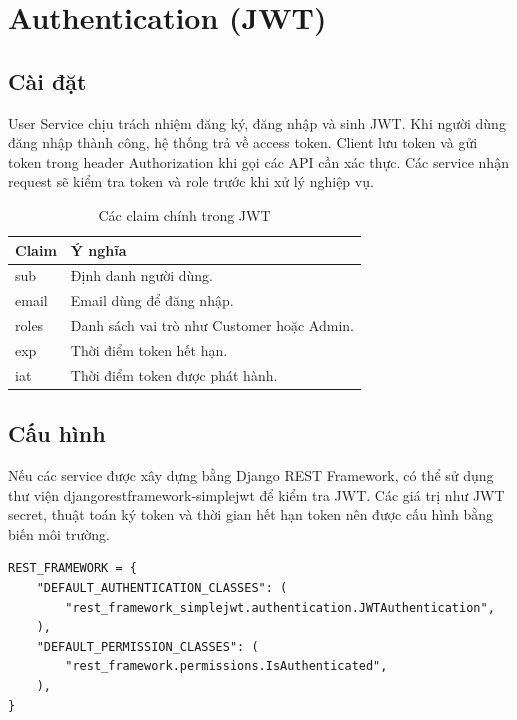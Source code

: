 \documentclass[../main.tex]{subfiles}
\begin{document}
\section{Authentication (JWT)}
\label{section:4.4}

\subsection{Cài đặt}
\label{subsection:4.4.1}

User Service chịu trách nhiệm đăng ký, đăng nhập và sinh JWT. Khi người dùng đăng nhập thành công, hệ thống trả về access token. Client lưu token và gửi token trong header Authorization khi gọi các API cần xác thực. Các service nhận request sẽ kiểm tra token và role trước khi xử lý nghiệp vụ.

\begin{table}[H]
    \centering
    \caption{Các claim chính trong JWT}
    \label{tab:chapter4-jwt-claims}
    \begin{tabular}{|p{}|p{}|}
        \hline
        \rowcolor{primary!35}
        \textbf{Claim} & \textbf{Ý nghĩa} \\
        \hline
        sub & Định danh người dùng. \\
        \hline
        email & Email dùng để đăng nhập. \\
        \hline
        roles & Danh sách vai trò như Customer hoặc Admin. \\
        \hline
        exp & Thời điểm token hết hạn. \\
        \hline
        iat & Thời điểm token được phát hành. \\
        \hline
    \end{tabular}
\end{table}

\subsection{Cấu hình}
\label{subsection:4.4.2}

Nếu các service được xây dựng bằng Django REST Framework, có thể sử dụng thư viện djangorestframework-simplejwt để kiểm tra JWT. Các giá trị như JWT secret, thuật toán ký token và thời gian hết hạn token nên được cấu hình bằng biến môi trường.

\begin{lstlisting}[caption={Cấu hình JWT trong Django REST Framework}, label={lst:chapter4-jwt-config}]
REST_FRAMEWORK = {
    "DEFAULT_AUTHENTICATION_CLASSES": (
        "rest_framework_simplejwt.authentication.JWTAuthentication",
    ),
    "DEFAULT_PERMISSION_CLASSES": (
        "rest_framework.permissions.IsAuthenticated",
    ),
}
\end{lstlisting}
\end{document}
